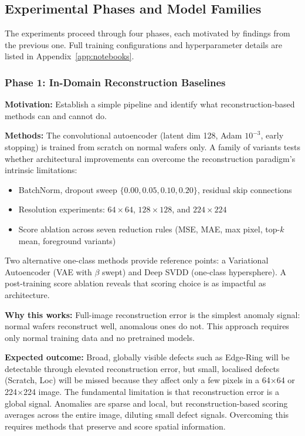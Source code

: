 \documentclass[11pt]{article}
\begin{document}
\subsection{Experimental Phases and Model Families}

The experiments proceed through four phases, each motivated by findings from the previous one.
Full training configurations and hyperparameter details are listed in Appendix~\ref{app:notebooks}.

\subsubsection{Phase 1: In-Domain Reconstruction Baselines}

\textbf{Motivation:} Establish a simple pipeline and identify what reconstruction-based
methods can and cannot do.

\textbf{Methods:} The convolutional autoencoder (latent dim 128, Adam $10^{-3}$, early stopping)
is trained from scratch on normal wafers only. A family of variants tests whether architectural
improvements can overcome the reconstruction paradigm's intrinsic limitations:
\begin{itemize}[leftmargin=1.5em]
  \item BatchNorm, dropout sweep $\{0.00, 0.05, 0.10, 0.20\}$, residual skip connections
  \item Resolution experiments: $64\!\times\!64$, $128\!\times\!128$, and $224\!\times\!224$
  \item Score ablation across seven reduction rules (MSE, MAE, max pixel, top-$k$ mean, foreground variants)
\end{itemize}
Two alternative one-class methods provide reference points: a Variational Autoencoder (VAE with $\beta$ swept)
and Deep SVDD (one-class hypersphere). A post-training score ablation reveals that scoring choice is
as impactful as architecture.

\textbf{Why this works:} Full-image reconstruction error is the simplest anomaly signal: normal wafers
reconstruct well, anomalous ones do not. This approach requires only normal training data and no pretrained models.

\textbf{Expected outcome:} Broad, globally visible defects such as Edge-Ring will be detectable through
elevated reconstruction error, but small, localised defects (Scratch, Loc) will be missed because they affect
only a few pixels in a 64$\times$64 or 224$\times$224 image. The fundamental limitation is that reconstruction error is a global signal.
Anomalies are sparse and local, but reconstruction-based scoring averages across the entire image, diluting
small defect signals. Overcoming this requires methods that preserve and score spatial information.
\end{document}
